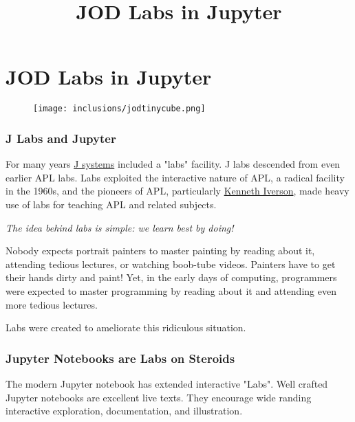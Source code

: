 \documentclass[11pt,letter,landscape]{article}
\title{JOD Labs in Jupyter}
\makeatletter
\def\maxwidth{\ifdim\Gin@nat@width>\linewidth\linewidth
    \else\Gin@nat@width\fi}
\let\Oldincludegraphics\includegraphics
\renewcommand{\includegraphics}[1]{\Oldincludegraphics[width=.8\maxwidth]{#1}}
\makeatother
\begin{document}
    
    
    \maketitle
    
    

    
    \section{JOD Labs in Jupyter}\label{jod-labs-in-jupyter}

\begin{figure}
\centering
\texttt{[image: inclusions/jodtinycube.png]}
\caption{}
\end{figure}

    \subsubsection{J Labs and Jupyter}\label{j-labs-and-jupyter}

For many years \href{http://www.jsoftware.com/}{J systems} included a
"labs" facility. J labs descended from even earlier APL labs. Labs
exploited the interactive nature of APL, a radical facility in the
1960s, and the pioneers of APL, particularly
\href{https://en.wikipedia.org/wiki/Kenneth_E._Iverson}{Kenneth
Iverson}, made heavy use of labs for teaching APL and related subjects.

\emph{The idea behind labs is simple: we learn best by doing!}

Nobody expects portrait painters to master painting by reading about it,
attending tedious lectures, or watching boob-tube videos. Painters have
to get their hands dirty and paint! Yet, in the early days of computing,
programmers were expected to master programming by reading about it and
attending even more tedious lectures.

Labs were created to ameliorate this ridiculous situation.

    \subsubsection{Jupyter Notebooks are Labs on
Steroids}\label{jupyter-notebooks-are-labs-on-steroids}

The modern Jupyter notebook has extended interactive "Labs". Well
crafted Jupyter notebooks are excellent live texts. They encourage wide
randing interactive exploration, documentation, and illustration.
\end{document}
